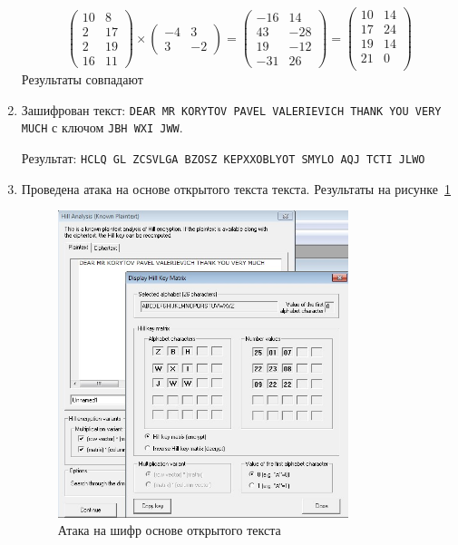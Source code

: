 \documentclass[a4paper, 14pt]{extarticle}
\begin{document}
\begin{enumerate}
    \begin{equation*}
        \left( \begin{matrix}
            10 & 8\\
            2 & 17\\
            2 & 19\\
            16 & 11
        \end{matrix} \right) \times
        \left(\begin{matrix}
            -4 & 3\\
            3 & -2
        \end{matrix}\right) = \left( \begin{matrix}
            -16 & 14\\
            43 & -28\\
            19 & -12\\
            -31 & 26
        \end{matrix} \right) = \left( \begin{matrix}
            10 & 14 \\
            17 & 24 \\
            19 & 14 \\
            21 & 0 \\
        \end{matrix} \right)
    \end{equation*}
    Результаты совпадают
    \item Зашифрован текст: \texttt{DEAR MR KORYTOV PAVEL VALERIEVICH THANK YOU VERY MUCH} с ключом \texttt{JBH WXI JWW}.
        
    Результат: \texttt{HCLQ GL ZCSVLGA BZOSZ KEPXXOBLYOT SMYLO AQJ TCTI JLWO}

\item Проведена атака на основе открытого текста текста. Результаты на рисунке~\ref{img:1:3}
    \begin{figure}[h]
        \centering
        \includegraphics[width=0.8\textwidth]{./img/S004.jpg}
        \caption{Атака на шифр основе открытого текста}%
        \label{img:1:3}
    \end{figure}
    

\end{enumerate}
\end{document}

